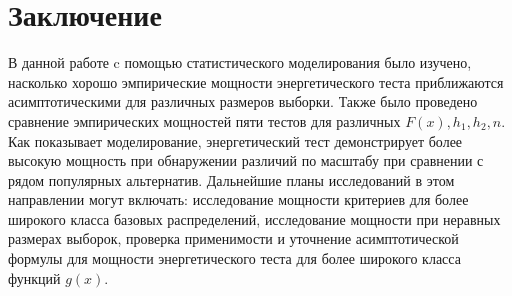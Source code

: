 \documentclass[12pt]{article}
\theoremstyle{break}
\begin{document}
\section{Заключение}
В данной работе c помощью статистического моделирования было изучено, насколько хорошо эмпирические мощности энергетического теста приближаются асимптотическими для различных размеров выборки.
Также было проведено сравнение эмпирических мощностей пяти тестов для различных $F(x), h_1, h_2, n$. Как показывает моделирование, энергетический тест демонстрирует более высокую мощность при обнаружении различий по масштабу при сравнении с рядом популярных альтернатив. Дальнейшие планы исследований в этом направлении могут включать: исследование мощности критериев для более широкого класса базовых распределений, исследование мощности при неравных размерах выборок, проверка применимости и уточнение асимптотической формулы для мощности энергетического теста для более широкого класса функций $g(x)$.




\end{document}
